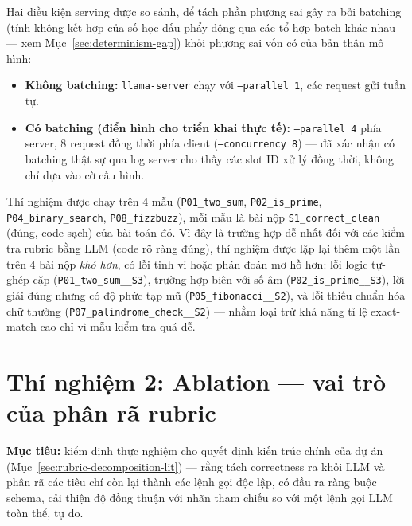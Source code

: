 \documentclass[a4paper,12pt]{report}
\begin{document}
Hai điều kiện serving được so sánh, để tách phần phương sai gây ra bởi
batching (tính không kết hợp của số học dấu phẩy động qua các tổ hợp batch
khác nhau — xem Mục~\ref{sec:determinism-gap}) khỏi phương sai vốn có của
bản thân mô hình:
\begin{itemize}
  \item \textbf{Không batching:} \texttt{llama-server} chạy với
    \texttt{--parallel 1}, các request gửi tuần tự.
  \item \textbf{Có batching (điển hình cho triển khai thực tế):}
    \texttt{--parallel 4} phía server, 8 request đồng thời phía client
    (\texttt{--concurrency 8}) — đã xác nhận có batching thật sự qua log
    server cho thấy các slot ID xử lý đồng thời, không chỉ dựa vào cờ cấu
    hình.
\end{itemize}

Thí nghiệm được chạy trên 4 mẫu (\texttt{P01\_two\_sum},
\texttt{P02\_is\_prime}, \texttt{P04\_binary\_search},
\texttt{P08\_fizzbuzz}), mỗi mẫu là bài nộp \texttt{S1\_correct\_clean}
(đúng, code sạch) của bài toán đó. Vì đây là trường hợp dễ nhất đối với các
kiểm tra rubric bằng LLM (code rõ ràng đúng), thí nghiệm được lặp lại thêm
một lần trên 4 bài nộp \emph{khó hơn}, có lỗi tinh vi hoặc phán đoán mơ hồ
hơn: lỗi logic tự-ghép-cặp (\texttt{P01\_two\_sum\_\_S3}), trường hợp biên
với số âm (\texttt{P02\_is\_prime\_\_S3}), lời giải đúng nhưng có độ phức
tạp mũ (\texttt{P05\_fibonacci\_\_S2}), và lỗi thiếu chuẩn hóa chữ thường
(\texttt{P07\_palindrome\_check\_\_S2}) — nhằm loại trừ khả năng tỉ lệ
exact-match cao chỉ vì mẫu kiểm tra quá dễ.

\section{Thí nghiệm 2: Ablation — vai trò của phân rã rubric}
\label{sec:exp-ablation}

\textbf{Mục tiêu:} kiểm định thực nghiệm cho quyết định kiến trúc chính của
dự án (Mục~\ref{sec:rubric-decomposition-lit}) — rằng tách correctness ra
khỏi LLM và phân rã các tiêu chí còn lại thành các lệnh gọi độc lập, có đầu
ra ràng buộc schema, cải thiện độ đồng thuận với nhãn tham chiếu so với một
lệnh gọi LLM toàn thể, tự do.
\end{document}

